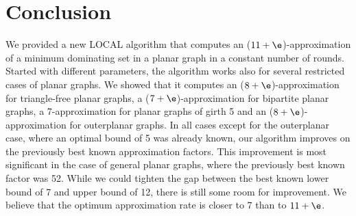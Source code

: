 
\section{Conclusion}
We provided a new LOCAL algorithm that computes an
($11+\e$)\hspace{1pt}-\hspace{1pt}approximation of
a minimum dominating set in a planar graph in a constant number of
rounds. Started with different parameters, the algorithm works also
for several restricted cases of planar graphs. We showed that
it computes an ($8+\e$)\hspace{1pt}-\hspace{1pt}approximation for
triangle-free planar graphs, a ($7+\e$)\hspace{1pt}-\hspace{1pt}approximation
for bipartite planar graphs, a 7\hspace{1pt}-\hspace{1pt}approximation
for planar graphs of girth 5 and an
($8+\e$)\hspace{1pt}-\hspace{1pt}approximation
for outerplanar graphs. In all cases except for the outerplanar case,
where an optimal bound of 5 was already known, our algorithm
improves on the previously best known approximation factors.
This improvement is most significant in the case of general planar
graphs, where the previously best known factor was 52.
While we could tighten the gap between the best known lower bound of 7
and upper bound of 12, there is still some room for improvement. We
believe that the optimum approximation rate is closer to $7$ than
to $11+\e$.

